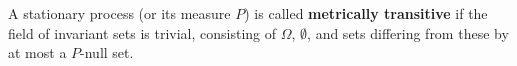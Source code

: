 A stationary process (or its measure $P$) is called \textbf{metrically transitive} if the field of invariant sets is trivial, consisting of $\Omega$, $\emptyset$, and sets differing from these by at most a $P$-null set.
